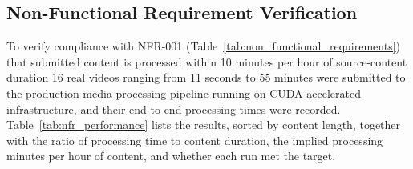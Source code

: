 \documentclass[oneside]{utmthesis}
\begin{document}
\subsection{Non-Functional Requirement Verification}\label{sec:nfr_verification}
To verify compliance with NFR-001 (Table~\ref{tab:non_functional_requirements}) that submitted content is processed within 10 minutes per hour of source-content duration  16 real videos ranging from 11 seconds to 55 minutes were submitted to the production media-processing pipeline running on CUDA-accelerated infrastructure, and their end-to-end processing times were recorded. Table~\ref{tab:nfr_performance} lists the results, sorted by content length, together with the ratio of processing time to content duration, the implied processing minutes per hour of content, and whether each run met the target.
\end{document}

